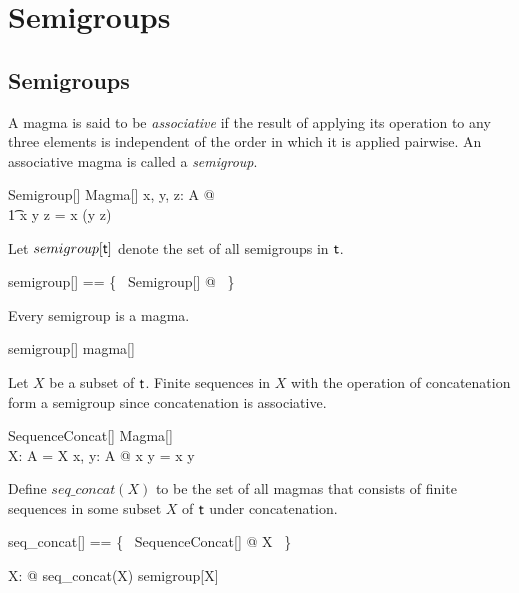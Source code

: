 \documentclass{amsart}
\begin{document}
\section{Semigroups}

\subsection{Semigroups}

A magma is said to be \textit{associative} if the result of applying its operation to any three elements
is independent of the order in which it is applied pairwise.
An associative magma is called a \textit{semigroup}.

\begin{schema}{Semigroup}[\genT]
	Magma[\genT]
\where
	\forall x, y, z: A @ \\
	\t1	x \opG y \opG z = x \opG (y \opG z)
\end{schema}

Let $semigroup[\mathsf{t}]$ denote the set of all semigroups in $\mathsf{t}$.

\begin{zed}
	semigroup[\genT] == \{~ Semigroup[\genT] @ \strucA  ~\}
\end{zed}

\begin{remark} Every semigroup is a magma.

\begin{zed}
	semigroup[\setT] \subseteq magma[\setT]
\end{zed}

\end{remark}

\begin{example}
Let $X$ be a subset of $\mathsf{t}$.
Finite sequences in $X$ with the operation of concatenation form a semigroup
since concatenation is associative.

\begin{schema}{SequenceConcat}[\genT]
	Magma[\seq \genT] \\
	X: \power \genT
\where
	A = \seq X
\also
	\forall x, y: A @ x \opG y = x \cat y
\end{schema}

Define $seq\_concat(X)$ to be the set of all magmas that consists of finite sequences in some subset
$X$ of $\mathsf{t}$ under concatenation.

\begin{zed}
	seq\_concat[\genT] == \{~ SequenceConcat[\genT] @ X \mapsto \strucA ~\}
\end{zed}

\begin{zed}
	\forall X: \power \setT @ seq\_concat(X) \in semigroup[\seq X]
\end{zed}

\end{example}
\end{document}

